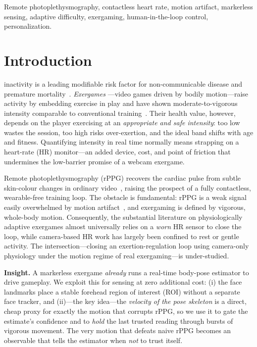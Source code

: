 \documentclass[journal,10pt]{IEEEtran}
\begin{document}
\begin{IEEEkeywords}
Remote photoplethysmography, contactless heart rate, motion artifact, markerless
sensing, adaptive difficulty, exergaming, human-in-the-loop control, personalization.
\end{IEEEkeywords}

\section{Introduction}
 inactivity is a leading modifiable risk factor for
non-communicable disease and premature mortality~\cite{who2020}. \emph{Exergames}
---video games driven by bodily motion---raise activity by embedding exercise in
play and have shown moderate-to-vigorous intensity comparable to conventional
training~\cite{exergame-meta}. Their health value, however, depends on the player
exercising at an \emph{appropriate and safe intensity}: too low wastes the
session, too high risks over-exertion, and the ideal band shifts with age and
fitness. Quantifying intensity in real time normally means strapping on a
heart-rate (HR) monitor---an added device, cost, and point of friction that
undermines the low-barrier promise of a webcam exergame.

Remote photoplethysmography (rPPG) recovers the cardiac pulse from subtle
skin-colour changes in ordinary video~\cite{verkruysse2008,poh2010,dehaan2013,wang2017},
raising the prospect of a fully contactless, wearable-free training loop. The
obstacle is fundamental: rPPG is a weak signal easily overwhelmed by motion
artifact~\cite{rppg-survey}, and exergaming is defined by vigorous, whole-body
motion. Consequently, the substantial literature on physiologically adaptive
exergames almost universally relies on a \emph{worn} HR sensor to close the loop,
while camera-based HR work has largely been confined to rest or gentle activity.
The intersection---closing an exertion-regulation loop using camera-only
physiology under the motion regime of real exergaming---is under-studied.

\textbf{Insight.} A markerless exergame \emph{already} runs a real-time body-pose
estimator to drive gameplay. We exploit this for sensing at zero additional cost:
(i) the face landmarks place a stable forehead region of interest (ROI) without a
separate face tracker, and (ii)---the key idea---the \emph{velocity of the pose
skeleton} is a direct, cheap proxy for exactly the motion that corrupts rPPG, so
we use it to gate the estimate's confidence and to \emph{hold} the last trusted
reading through bursts of vigorous movement. The very motion that defeats naive
rPPG becomes an observable that tells the estimator when \emph{not} to trust
itself.
\end{document}
